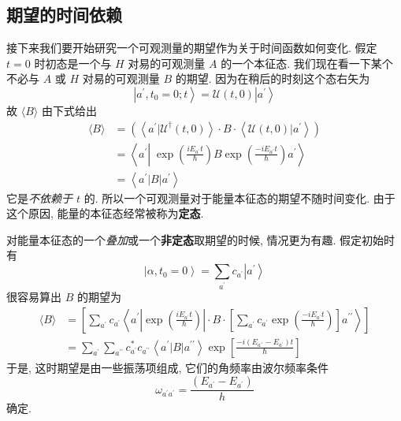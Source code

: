 \subsection{期望的时间依赖}
接下来我们要开始研究一个可观测量的期望作为关于时间函数如何变化. 假定 $t = 0$ 时初态是一个与 $H$ 对易的可观测量 $A$ 的一个本征态. 我们现在看一下某个不必与 $A$ 或 $H$ 对易的可观测量 $B$ 的期望. 因为在稍后的时刻这个态右矢为
\begin{equation}
	\left| {{a}^{\prime },{t}_{0} = 0;t}\right\rangle = \mathcal{U}\left( {t,0}\right) \left| {a}^{\prime }\right\rangle
\end{equation}
故 $\langle B\rangle$ 由下式给出
\begin{equation}
	\begin{aligned}
		\langle B\rangle &= \left( {\left\langle {{a}^{\prime } | {\mathcal{U}}^{\dagger}\left( {t,0}\right) }\right\rangle \cdot B \cdot \left\langle {\mathcal{U}\left( {t,0}\right) | {a}^{\prime }}\right\rangle }\right)\\
		&= \left\langle {{a}^{\prime }\left| {\;\exp \left( \frac{i{E}_{{a}^{\prime }}t}{\hbar }\right) B\exp \left( \frac{-i{E}_{{a}^{\prime }}t}{\hbar }\right) }\right. {a}^{\prime }}\right\rangle\\
		&= \left\langle {{a}^{\prime }\left| B\right| {a}^{\prime }}\right\rangle
	\end{aligned}
\end{equation}
它是\textit{不依赖于 $t$} 的. 所以一个可观测量对于能量本征态的期望不随时间变化. 由于这个原因, 能量的本征态经常被称为\textbf{定态}.

对能量本征态的一个\textit{叠加}或一个\textbf{非定态}取期望的时候, 情况更为有趣. 假定初始时有
\begin{equation}
	\left| {\alpha ,{t}_{0} = 0}\right\rangle = \mathop{\sum }\limits_{{a}^{\prime }}{c}_{{a}^{\prime }}\left| {a}^{\prime }\right\rangle
\end{equation}
很容易算出 $B$ 的期望为
\begin{equation}
	\begin{aligned}
		\langle B\rangle &= \left\lbrack {\mathop{\sum }\limits_{{a}^{\prime }}{c}_{{a}^{\prime }}\left\langle {{a}^{\prime }\left| {\exp \left( \frac{i{E}_{{a}^{\prime }}t}{\hbar }\right) }\right| \cdot B \cdot \left\lbrack {\mathop{\sum }\limits_{{a}^{\prime }}{c}_{{a}^{\prime }}\exp \left( \frac{-i{E}_{{a}^{\prime }}t}{\hbar }\right) }\right\rbrack {a}^{\prime \prime }}\right\rangle }\right\rbrack\\
		&= \mathop{\sum }\limits_{{a}^{\prime }}\mathop{\sum }\limits_{{a}^{\prime \prime }}{c}_{{a}^{\prime }}^{ * }{c}_{{a}^{\prime \prime }}\left\langle {{a}^{\prime }\left| B\right| {a}^{\prime \prime }}\right\rangle \exp \left\lbrack \frac{-i\left( {{E}_{{a}^{\prime \prime }} - {E}_{{a}^{\prime }}}\right) t}{\hbar }\right\rbrack
	\end{aligned}
\end{equation}
于是, 这时期望是由一些振荡项组成, 它们的角频率由波尔频率条件
\begin{equation}
	{\omega }_{{a}^{\prime }{a}^{\prime }} = \frac{\left( {E}_{{a}^{\prime }} - {E}_{{a}^{\prime }}\right) }{h}
\end{equation}
确定.

